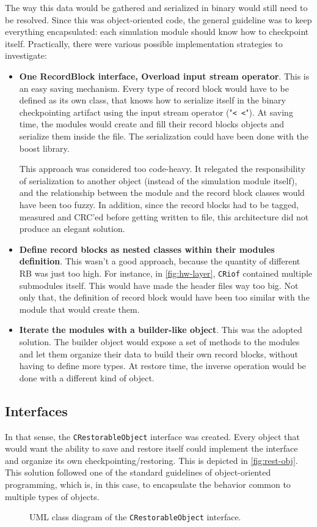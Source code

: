 {The way this data would be gathered and serialized in binary would still need to be resolved. Since this was object-oriented code, the general guideline was to keep everything encapsulated: each simulation module should know how to checkpoint itself. Practically, there were various possible implementation strategies to investigate:
\begin{itemize}
	\item \textbf{One RecordBlock interface, Overload input stream operator}. This is an easy saving mechanism. Every type of record block would have to be defined as its own class, that knows how to serialize itself in the binary checkpointing artifact using the input stream operator ("\texttt{< <}"). At saving time, the modules would create and fill their record blocks objects and serialize them inside the file. The serialization could have been done with the boost library\cite{online:boost}.
	
	This approach was considered too code-heavy. It relegated the responsibility of serialization to another object (instead of the simulation module itself), and the relationship between the module and the record block classes would have been too fuzzy. In addition, since the record blocks had to be tagged, measured and CRC'ed before getting written to file, this architecture did not produce an elegant solution. 
	\item \textbf{Define record blocks as nested classes within their modules definition}. This wasn't a good approach, because the quantity of different \gls{RB} was just too high. For instance, in \autoref{fig:hw-layer}, \texttt{CRiof} contained multiple submodules itself. This would have made the header files way too big. Not only that, the definition of record block would have been too similar with the module that would create them. 
	\item \textbf{Iterate the modules with a builder-like object}. This was the adopted solution. The builder object would expose a set of methods to the modules and let them organize their data to build their own record blocks, without having to define more types. At restore time, the inverse operation would be done with a different kind of object.
\end{itemize}

\subsection*{\Cpp Interfaces}
In that sense, the \texttt{CRestorableObject} interface was created. Every object that would want the ability to save and restore itself could implement the interface and organize its own checkpointing/restoring. This is depicted in \autoref{fig:rest-obj}. This solution followed one of the standard guidelines of object-oriented programming, which is, in this case, to encapsulate the behavior common to multiple types of objects. 
\begin{figure}[htbp]
	\centering
	\vspace{12pt}
	\footnotesize
	
	\caption{UML class diagram of the \texttt{CRestorableObject} interface.}
	\label{fig:rest-obj}
\end{figure}

}
